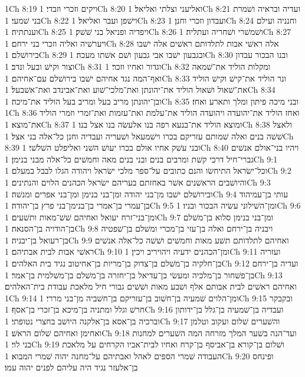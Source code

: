1Ch 8:19  ויקים וזכרי וזבדי׃
1Ch 8:20  ואליעני וצלתי ואליאל׃
1Ch 8:21  ועדיה ובראיה ושׁמרת בני שׁמעי׃
1Ch 8:22  וישׁפן ועבר ואליאל׃
1Ch 8:23  ועבדון וזכרי וחנן׃
1Ch 8:24  וחנניה ועילם וענתתיה׃
1Ch 8:25  ויפדיה ופניאל בני שׁשׁק׃
1Ch 8:26  ושׁמשׁרי ושׁחריה ועתליה׃
1Ch 8:27  ויערשׁיה ואליה וזכרי בני ירחם׃
1Ch 8:28  אלה ראשׁי אבות לתלדותם ראשׁים אלה ישׁבו בירושׁלם׃
1Ch 8:29  ובגבעון ישׁבו אבי גבעון ושׁם אשׁתו מעכה׃
1Ch 8:30  ובנו הבכור עבדון וצור וקישׁ ובעל ונדב׃
1Ch 8:31  וגדור ואחיו וזכר׃
1Ch 8:32  ומקלות הוליד את־שׁמאה ואף־המה נגד אחיהם ישׁבו בירושׁלם עם־אחיהם׃
1Ch 8:33  ונר הוליד את־קישׁ וקישׁ הוליד את־שׁאול ושׁאול הוליד את־יהונתן ואת־מלכי־שׁוע ואת־אבינדב ואת־אשׁבעל׃
1Ch 8:34  ובן־יהונתן מריב בעל ומריב בעל הוליד את־מיכה׃
1Ch 8:35  ובני מיכה פיתון ומלך ותארע ואחז׃
1Ch 8:36  ואחז הוליד את־יהועדה ויהועדה הוליד את־עלמת ואת־עזמות ואת־זמרי וזמרי הוליד את־מוצא׃
1Ch 8:37  ומוצא הוליד את־בנעא רפה בנו אלעשׂה בנו אצל בנו׃
1Ch 8:38  ולאצל שׁשׁה בנים ואלה שׁמותם עזריקם בכרו וישׁמעאל ושׁעריה ועבדיה וחנן כל־אלה בני אצל׃
1Ch 8:39  ובני עשׁק אחיו אולם בכרו יעושׁ השׁני ואליפלט השׁלשׁי׃
1Ch 8:40  ויהיו בני־אולם אנשׁים גברי־חיל דרכי קשׁת ומרבים בנים ובני בנים מאה וחמשׁים כל־אלה מבני בנימן׃
1Ch 9:1  וכל־ישׂראל התיחשׂו והנם כתובים על־ספר מלכי ישׂראל ויהודה הגלו לבבל במעלם׃
1Ch 9:2  והיושׁבים הראשׁנים אשׁר באחזתם בעריהם ישׂראל הכהנים הלוים והנתינים׃
1Ch 9:3  ובירושׁלם ישׁבו מן־בני יהודה ומן־בני בנימן ומן־בני אפרים ומנשׁה׃
1Ch 9:4  עותי בן־עמיהוד בן־עמרי בן־אמרי בן־בנימן־בני פרץ בן־יהודה׃
1Ch 9:5  ומן־השׁילוני עשׂיה הבכור ובניו׃
1Ch 9:6  ומן־בני־זרח יעואל ואחיהם שׁשׁ־מאות ותשׁעים׃
1Ch 9:7  ומן־בני בנימן סלוא בן־משׁלם בן־הודויה בן־הסנאה׃
1Ch 9:8  ויבניה בן־ירחם ואלה בן־עזי בן־מכרי ומשׁלם בן־שׁפטיה בן־רעואל בן־יבניה׃
1Ch 9:9  ואחיהם לתלדותם תשׁע מאות וחמשׁים ושׁשׁה כל־אלה אנשׁים ראשׁי אבות לבית אבתיהם׃
1Ch 9:10  ומן־הכהנים ידעיה ויהויריב ויכין׃
1Ch 9:11  ועזריה בן־חלקיה בן־משׁלם בן־צדוק בן־מריות בן־אחיטוב נגיד בית האלהים׃
1Ch 9:12  ועדיה בן־ירחם בן־פשׁחור בן־מלכיה ומעשׂי בן־עדיאל בן־יחזרה בן־משׁלם בן־משׁלמית בן־אמר׃
1Ch 9:13  ואחיהם ראשׁים לבית אבותם אלף ושׁבע מאות ושׁשׁים גבורי חיל מלאכת עבודת בית־האלהים׃
1Ch 9:14  ומן־הלוים שׁמעיה בן־חשׁוב בן־עזריקם בן־חשׁביה מן־בני מררי׃
1Ch 9:15  ובקבקר חרשׁ וגלל ומתניה בן־מיכא בן־זכרי בן־אסף׃
1Ch 9:16  ועבדיה בן־שׁמעיה בן־גלל בן־ידותון וברכיה בן־אסא בן־אלקנה היושׁב בחצרי נטופתי׃
1Ch 9:17  והשׁערים שׁלום ועקוב וטלמן ואחימן ואחיהם שׁלום הראשׁ׃
1Ch 9:18  ועד־הנה בשׁער המלך מזרחה המה השׁערים למחנות בני לוי׃
1Ch 9:19  ושׁלום בן־קורא בן־אביסף בן־קרח ואחיו לבית־אביו הקרחים על מלאכת העבודה שׁמרי הספים לאהל ואבתיהם על־מחנה יהוה שׁמרי המבוא׃
1Ch 9:20  ופינחס בן־אלעזר נגיד היה עליהם לפנים יהוה עמו׃

